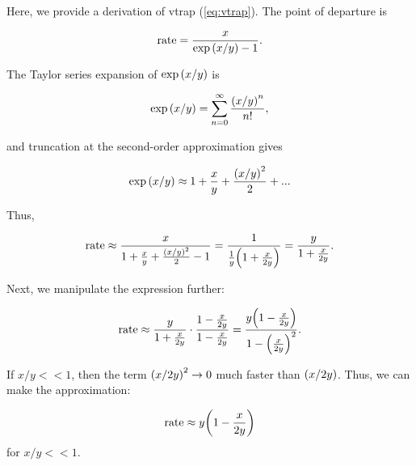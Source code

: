 Here, we provide a derivation of vtrap (\autoref{eq:vtrap}). The point of departure is

\begin{equation*}
    \mathrm{rate} = \frac{x}{\exp \qty(x/y) - 1}.
\end{equation*}

The Taylor series expansion of $\exp \qty(x / y)$ is

\begin{equation*}
    \exp \qty(x/y) = \sum_{n=0}^\infty \frac{\qty(x/y)^n}{n!},
\end{equation*}

and truncation at the second-order approximation gives 

\begin{equation*}
    \exp \qty(x/y) \approx 1 + \frac{x}{y} + \frac{\qty(x/y)^2}{2} + ...
\end{equation*}

Thus, 

\begin{equation*}
    \mathrm{rate} \approx \frac{x}{1 + \frac{x}{y} + \frac{\qty(x/y)^2}{2} - 1} = \frac{1}{\frac{1}{y} \qty(1 + \frac{x}{2y})} = \frac{y}{1 + \frac{x}{2y}}.
\end{equation*}

Next, we manipulate the expression further: 

\begin{equation*}
    \mathrm{rate} \approx \frac{y}{1 + \frac{x}{2y}} \cdot \frac{1 - \frac{x}{2y}}{1 - \frac{x}{2y}} = \frac{y \qty(1 - \frac{x}{2y}) }{1 - \qty(\frac{x}{2y})^2}.
\end{equation*}

If $x/y << 1$, then the term $\qty(x/2y)^2 \to 0$ much faster than $\qty(x / 2y)$. Thus, we can make the approximation: 

\begin{equation*}
    \mathrm{rate} \approx y \qty(1 - \frac{x}{2y})
\end{equation*}
for $x/y << 1$.

